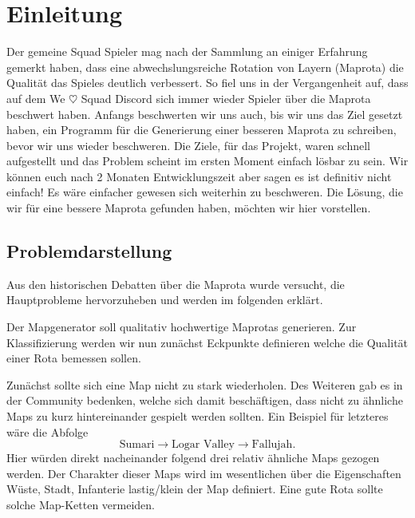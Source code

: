 \section{Einleitung}
        
        Der gemeine Squad Spieler mag nach der Sammlung an einiger Erfahrung gemerkt haben, dass eine abwechslungsreiche Rotation von Layern (Maprota)
        die Qualität das Spieles deutlich verbessert. So fiel uns in der Vergangenheit auf, dass auf dem We $\heartsuit$ Squad Discord sich immer wieder 
        Spieler über die Maprota beschwert haben. Anfangs beschwerten wir uns auch, bis wir uns das Ziel gesetzt haben, ein Programm 
        für die Generierung einer besseren Maprota zu schreiben, bevor wir uns wieder beschweren. 
        Die Ziele, für das Projekt, waren schnell aufgestellt und das Problem scheint im ersten Moment einfach lösbar zu sein.
        Wir können euch nach 2 Monaten Entwicklungszeit aber sagen es ist definitiv nicht einfach! Es wäre einfacher gewesen sich weiterhin zu beschweren.
        Die Lösung, die wir für eine bessere Maprota gefunden haben, möchten wir hier vorstellen.  

        \subsection{Problemdarstellung}
            Aus den historischen Debatten über die Maprota wurde versucht, die Hauptprobleme hervorzuheben und werden im folgenden erklärt.

            Der Mapgenerator soll qualitativ hochwertige Maprotas generieren.
            Zur Klassifizierung werden wir nun zunächst Eckpunkte definieren welche die Qualität einer Rota bemessen sollen.

            Zunächst sollte sich eine Map nicht zu stark wiederholen.
            Des Weiteren gab es in der Community bedenken, welche sich damit beschäftigen, dass nicht zu ähnliche Maps zu kurz hintereinander gespielt werden sollten. 
            Ein Beispiel für letzteres wäre die Abfolge 
            \begin{equation*}
                \text{Sumari} \rightarrow \text{Logar Valley} \rightarrow \text{Fallujah}.
            \end{equation*}
            Hier würden direkt nacheinander folgend drei relativ ähnliche Maps gezogen werden. 
            Der Charakter dieser Maps wird im wesentlichen über die Eigenschaften \glqq{}Wüste\grqq{}, \glqq{}Stadt\grqq{}, \glqq{}Infanterie lastig/klein\grqq{} der Map definiert.
            Eine gute Rota sollte solche Map-Ketten vermeiden.

